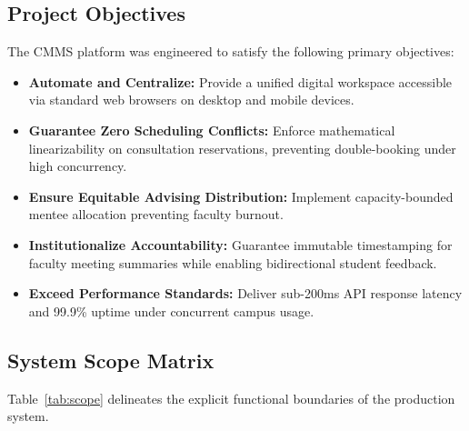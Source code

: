 \documentclass[11pt,a4paper]{article}
\begin{document}
\subsection{Project Objectives}
The CMMS platform was engineered to satisfy the following primary objectives:
\begin{itemize}[leftmargin=1.4em, itemsep=0.2em]
  \item \textbf{Automate and Centralize:} Provide a unified digital workspace accessible via standard web browsers on desktop and mobile devices.
  \item \textbf{Guarantee Zero Scheduling Conflicts:} Enforce mathematical linearizability on consultation reservations, preventing double-booking under high concurrency.
  \item \textbf{Ensure Equitable Advising Distribution:} Implement capacity-bounded mentee allocation preventing faculty burnout.
  \item \textbf{Institutionalize Accountability:} Guarantee immutable timestamping for faculty meeting summaries while enabling bidirectional student feedback.
  \item \textbf{Exceed Performance Standards:} Deliver sub-200ms API response latency and 99.9\% uptime under concurrent campus usage.
\end{itemize}

\subsection{System Scope Matrix}
Table~\ref{tab:scope} delineates the explicit functional boundaries of the production system.
\end{document}
